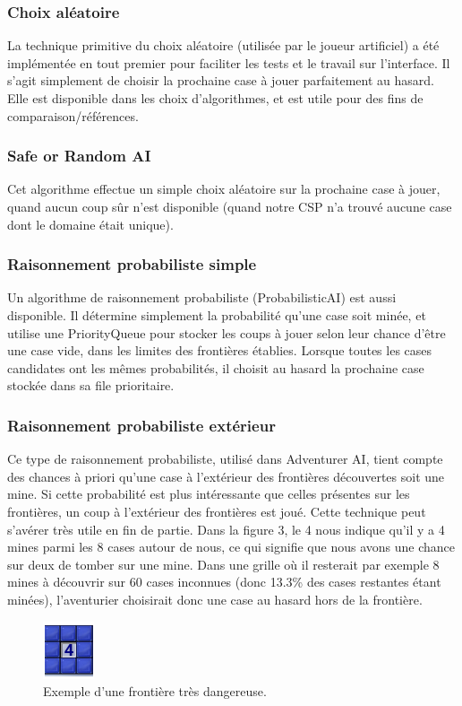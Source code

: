 \documentclass{article}
\begin{document}
\subsubsection{Choix aléatoire}
La technique primitive du choix aléatoire (utilisée par le joueur artificiel) a été implémentée 
en tout premier pour faciliter les tests et le travail sur l’interface. 
Il s’agit simplement de choisir la prochaine case à jouer parfaitement au hasard. 
Elle est disponible dans les choix d’algorithmes, et est utile pour des fins de comparaison/références.

\subsubsection{Safe or Random AI}
Cet algorithme effectue un simple choix 
aléatoire sur la prochaine case à jouer, quand aucun coup sûr n’est disponible 
(quand notre CSP n’a trouvé aucune case dont le domaine était unique).

\subsubsection{Raisonnement probabiliste simple}
Un algorithme de raisonnement probabiliste (ProbabilisticAI) est aussi disponible. 
Il détermine simplement la probabilité qu’une case soit minée, et utilise une 
PriorityQueue pour stocker les coups à jouer selon leur chance d’être une 
case vide, dans les limites des frontières établies. Lorsque toutes 
les cases candidates ont les mêmes probabilités, il choisit au hasard la prochaine case stockée dans sa file prioritaire.

\subsubsection{Raisonnement probabiliste extérieur}
Ce type de raisonnement probabiliste, utilisé dans Adventurer AI, tient compte des chances à priori qu’une case 
à l'extérieur des frontières découvertes soit une mine. Si cette probabilité est plus intéressante que celles présentes
sur les frontières, un coup à l'extérieur des frontières est joué. Cette technique peut s'avérer très utile en fin de partie.
Dans la figure 3, le 4 nous indique qu’il y a 4 mines parmi 
les 8 cases autour de nous, ce qui signifie que nous avons une chance sur deux de 
tomber sur une mine. Dans une grille où il resterait par exemple 8 mines à découvrir 
sur 60 cases inconnues (donc 13.3\% des cases restantes étant minées), 
l’aventurier choisirait donc une case au hasard hors de la frontière. 
\begin{figure}[h!]
\caption {Exemple d'une frontière très dangereuse.}
\centering
\includegraphics[scale=.5]{./demineur_3.png}
\end{figure}
\end{document}
